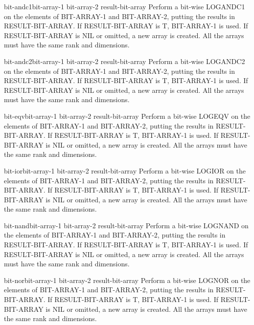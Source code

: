 \begin{function}{bit-andc1}{bit-array-1 bit-array-2 \op result-bit-array}{}
  Perform a bit-wise LOGANDC1 on the elements of BIT-ARRAY-1 and BIT-ARRAY-2,
  putting the results in RESULT-BIT-ARRAY. If RESULT-BIT-ARRAY is T,
  BIT-ARRAY-1 is used. If RESULT-BIT-ARRAY is NIL or omitted, a new array is
  created. All the arrays must have the same rank and dimensions.
\end{function}

\begin{function}{bit-andc2}{bit-array-1 bit-array-2 \op result-bit-array}{}
  Perform a bit-wise LOGANDC2 on the elements of BIT-ARRAY-1 and BIT-ARRAY-2,
  putting the results in RESULT-BIT-ARRAY. If RESULT-BIT-ARRAY is T,
  BIT-ARRAY-1 is used. If RESULT-BIT-ARRAY is NIL or omitted, a new array is
  created. All the arrays must have the same rank and dimensions.
\end{function}

\begin{function}{bit-eqv}{bit-array-1 bit-array-2 \op result-bit-array}{}
  Perform a bit-wise LOGEQV on the elements of BIT-ARRAY-1 and BIT-ARRAY-2,
  putting the results in RESULT-BIT-ARRAY. If RESULT-BIT-ARRAY is T,
  BIT-ARRAY-1 is used. If RESULT-BIT-ARRAY is NIL or omitted, a new array is
  created. All the arrays must have the same rank and dimensions.
\end{function}

\begin{function}{bit-ior}{bit-array-1 bit-array-2 \op result-bit-array}{}
  Perform a bit-wise LOGIOR on the elements of BIT-ARRAY-1 and BIT-ARRAY-2,
  putting the results in RESULT-BIT-ARRAY. If RESULT-BIT-ARRAY is T,
  BIT-ARRAY-1 is used. If RESULT-BIT-ARRAY is NIL or omitted, a new array is
  created. All the arrays must have the same rank and dimensions.
\end{function}

\begin{function}{bit-nand}{bit-array-1 bit-array-2 \op result-bit-array}{}
  Perform a bit-wise LOGNAND on the elements of BIT-ARRAY-1 and BIT-ARRAY-2,
  putting the results in RESULT-BIT-ARRAY. If RESULT-BIT-ARRAY is T,
  BIT-ARRAY-1 is used. If RESULT-BIT-ARRAY is NIL or omitted, a new array is
  created. All the arrays must have the same rank and dimensions.
\end{function}

\begin{function}{bit-nor}{bit-array-1 bit-array-2 \op result-bit-array}{}
  Perform a bit-wise LOGNOR on the elements of BIT-ARRAY-1 and BIT-ARRAY-2,
  putting the results in RESULT-BIT-ARRAY. If RESULT-BIT-ARRAY is T,
  BIT-ARRAY-1 is used. If RESULT-BIT-ARRAY is NIL or omitted, a new array is
  created. All the arrays must have the same rank and dimensions.
\end{function}

